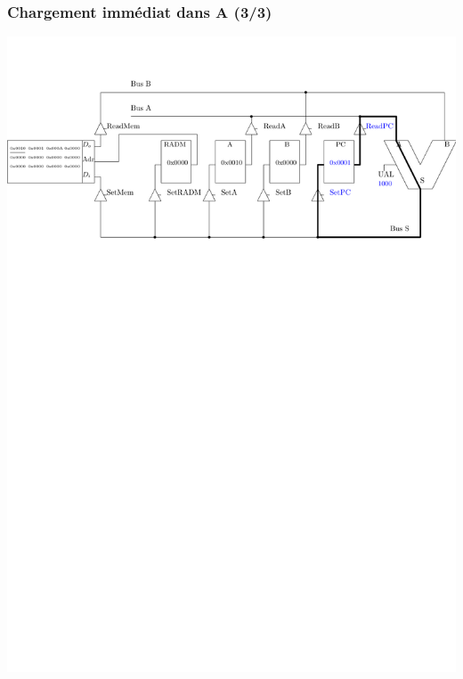 \documentclass{beamer}
\begin{document}
\begin{frame}
\frametitle{Chargement immédiat dans A (3/3)}
\centering\includegraphics[width=\linewidth]{Figs/premier_chemin_lda_3.pdf}
\end{frame}
\end{document}
